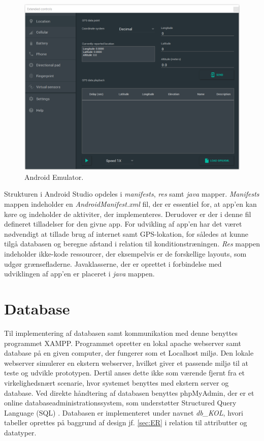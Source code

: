 \begin{figure} [H]
\centering
\includegraphics[width=1\textwidth]{figures/emulatorExtend}
\caption{Android Emulator.}
\label{fig:emulatorExtend}
\end{figure}

\noindent
Strukturen i Android Studio opdeles i \textit{manifests}, \textit{res} samt \textit{java} mapper. \textit{Manifests} mappen indeholder en \textit{AndroidManifest.xml} fil, der er essentiel for, at app'en kan køre og indeholder de aktiviter, der implementeres. Derudover er der i denne fil defineret tilladelser for den givne app. For udvikling af app'en har det været nødvendigt at tillade brug af internet samt GPS-lokation, for således at kunne tilgå databasen og beregne afstand i relation til konditionstræningen. 
\textit{Res} mappen indeholder ikke-kode ressourcer, der eksempelvis er de forskellige layouts, som udgør grænsefladerne.
Javaklasserne, der er oprettet i forbindelse med udviklingen af app'en er placeret i \textit{java} mappen.\cite{android2017}
 
\section{Database}
Til implementering af databasen samt kommunikation med denne benyttes programmet XAMPP. Programmet opretter en lokal apache webserver samt database på en given computer, der fungerer som et Localhost miljø. Den lokale webserver simulerer en ekstern webserver, hvilket giver et passende miljø til at teste og udvikle prototypen. Dertil anses dette ikke som værende fjernt fra et virkelighedsnært scenarie, hvor systemet benyttes med ekstern server og database.
Ved direkte håndtering af databasen benyttes phpMyAdmin, der er et online databaseadministrationssystem, som understøtter Structured Query Language (SQL) \cite{silbershatz2011}. 
Databasen er implementeret under navnet \textit{db\_KOL}, hvori tabeller oprettes på baggrund af design jf. \autoref{sec:ER} i relation til attributter og datatyper.

